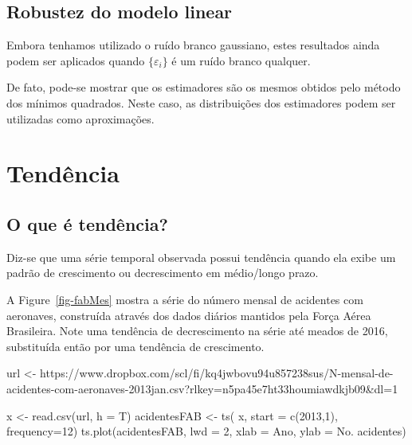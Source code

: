 \documentclass[
  letterpaper,
  DIV=11,
  numbers=noendperiod]{scrartcl}
\newenvironment{Shaded}{\begin{snugshade}}{\end{snugshade}}
\newcommand{\AttributeTok}[1]{\textcolor[rgb]{0.40,0.45,0.13}{#1}}
\newcommand{\DecValTok}[1]{\textcolor[rgb]{0.68,0.00,0.00}{#1}}
\newcommand{\FunctionTok}[1]{\textcolor[rgb]{0.28,0.35,0.67}{#1}}
\newcommand{\NormalTok}[1]{\textcolor[rgb]{0.00,0.23,0.31}{#1}}
\newcommand{\OtherTok}[1]{\textcolor[rgb]{0.00,0.23,0.31}{#1}}
\newcommand{\StringTok}[1]{\textcolor[rgb]{0.13,0.47,0.30}{#1}}
\theoremstyle{definition}
\theoremstyle{definition}
\theoremstyle{plain}
\theoremstyle{plain}
\theoremstyle{remark}
\begin{document}
\section{Robustez do modelo linear}\label{robustez-do-modelo-linear}

Embora tenhamos utilizado o ruído branco gaussiano, estes resultados
ainda podem ser aplicados quando \(\{\varepsilon_i\}\) é um ruído branco
qualquer.

De fato, pode-se mostrar que os estimadores são os mesmos obtidos pelo
método dos mínimos quadrados. Neste caso, as distribuições dos
estimadores podem ser utilizadas como aproximações.


\chapter{Tendência}\label{tenduxeancia}

\section{O que é tendência?}\label{o-que-uxe9-tenduxeancia}

Diz-se que uma série temporal observada possui tendência quando ela
exibe um padrão de crescimento ou decrescimento em médio/longo prazo.

A Figure~\ref{fig-fabMes} mostra a série do número mensal de acidentes
com aeronaves, construída através dos dados diários mantidos pela Força
Aérea Brasileira. Note uma tendência de decrescimento na série até
meados de 2016, substituída então por uma tendência de crescimento.

\begin{Shaded}
\begin{Highlighting}[]
\NormalTok{url }\OtherTok{\textless{}{-}} \StringTok{\textquotesingle{}https://www.dropbox.com/scl/fi/kq4jwbovu94u857238sus/N{-}mensal{-}de{-}acidentes{-}com{-}aeronaves{-}2013jan.csv?rlkey=n5pa45e7ht33houmiawdkjb09\&dl=1\textquotesingle{}}

\NormalTok{x }\OtherTok{\textless{}{-}} \FunctionTok{read.csv}\NormalTok{(url, }\AttributeTok{h =}\NormalTok{ T)}
\NormalTok{acidentesFAB }\OtherTok{\textless{}{-}} \FunctionTok{ts}\NormalTok{( x, }\AttributeTok{start =} \FunctionTok{c}\NormalTok{(}\DecValTok{2013}\NormalTok{,}\DecValTok{1}\NormalTok{), }\AttributeTok{frequency=}\DecValTok{12}\NormalTok{)}
\FunctionTok{ts.plot}\NormalTok{(acidentesFAB, }\AttributeTok{lwd =} \DecValTok{2}\NormalTok{, }\AttributeTok{xlab =} \StringTok{\textquotesingle{}Ano\textquotesingle{}}\NormalTok{, }\AttributeTok{ylab =} \StringTok{\textquotesingle{}No. acidentes\textquotesingle{}}\NormalTok{)}
\end{Highlighting}
\end{Shaded}
\end{document}
